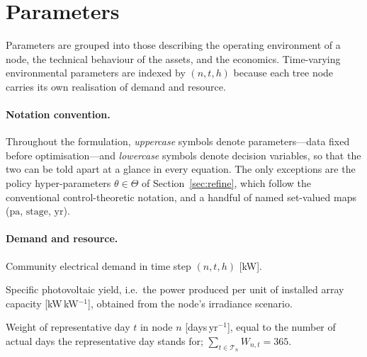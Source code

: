 \documentclass[11pt,a4paper]{article}
\theoremstyle{plain}
\theoremstyle{definition}
\newcommand{\pa}{\mathrm{pa}}
\begin{document}
\section{Parameters}
\label{sec:parameters}

Parameters are grouped into those describing the operating environment of a node, the
technical behaviour of the assets, and the economics. Time-varying environmental
parameters are indexed by $(n,t,h)$ because each tree node carries its own realisation
of demand and resource.

\paragraph{Notation convention.} Throughout the formulation, \emph{uppercase} symbols
denote parameters---data fixed before optimisation---and \emph{lowercase} symbols denote
decision variables, so that the two can be told apart at a glance in every equation. The
only exceptions are the policy hyper-parameters $\theta\in\Theta$ of
Section~\ref{sec:refine}, which follow the conventional control-theoretic notation, and a
handful of named set-valued maps ($\pa$, $\mathrm{stage}$, $\mathrm{yr}$).

\paragraph{Demand and resource.}
\begin{description}[leftmargin=3.0cm,style=nextline]
  \item[$D_{n,t,h}$] Community electrical demand in time step $(n,t,h)$ [kW].
  \item[$Y_{n,t,h}$] Specific photovoltaic yield, i.e.\ the power produced per unit of
  installed array capacity [kW\,kW$^{-1}$], obtained from the node's irradiance scenario.
  \item[$W_{n,t}$] Weight of representative day $t$ in node $n$ [days\,yr$^{-1}$], equal
  to the number of actual days the representative day stands for; $\sum_{t\in
  \mathcal{T}_n} W_{n,t}=365$.
\end{description}
\end{document}
